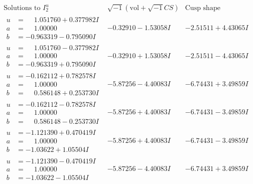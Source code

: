 \documentclass[1p]{elsarticle_modified}
\theoremstyle{definition}
\newcommand{\I}{\sqrt{-1}}
\begin{document}
$$\begin{array}{c|c|c}  
\text{Solutions to }I^u_{2}& \I (\text{vol} + \sqrt{-1}CS) & \text{Cusp shape}\\
 \hline 
\begin{aligned}
u &= \phantom{-}1.051760 + 0.377982 I \\
a &= \phantom{-}1.00000\phantom{ +0.000000I} \\
b &= -0.963319 - 0.795090 I\end{aligned}
 & -0.32910 - 1.53058 I & -2.51511 + 4.43065 I \\ \hline\begin{aligned}
u &= \phantom{-}1.051760 - 0.377982 I \\
a &= \phantom{-}1.00000\phantom{ +0.000000I} \\
b &= -0.963319 + 0.795090 I\end{aligned}
 & -0.32910 + 1.53058 I & -2.51511 - 4.43065 I \\ \hline\begin{aligned}
u &= -0.162112 + 0.782578 I \\
a &= \phantom{-}1.00000\phantom{ +0.000000I} \\
b &= \phantom{-}0.586148 + 0.253730 I\end{aligned}
 & -5.87256 - 4.40083 I & -6.74431 + 3.49859 I \\ \hline\begin{aligned}
u &= -0.162112 - 0.782578 I \\
a &= \phantom{-}1.00000\phantom{ +0.000000I} \\
b &= \phantom{-}0.586148 - 0.253730 I\end{aligned}
 & -5.87256 + 4.40083 I & -6.74431 - 3.49859 I \\ \hline\begin{aligned}
u &= -1.121390 + 0.470419 I \\
a &= \phantom{-}1.00000\phantom{ +0.000000I} \\
b &= -1.03622 + 1.05504 I\end{aligned}
 & -5.87256 + 4.40083 I & -6.74431 - 3.49859 I \\ \hline\begin{aligned}
u &= -1.121390 - 0.470419 I \\
a &= \phantom{-}1.00000\phantom{ +0.000000I} \\
b &= -1.03622 - 1.05504 I\end{aligned}
 & -5.87256 - 4.40083 I & -6.74431 + 3.49859 I \\ \hline\begin{aligned}

\end{aligned}
\end{array}$$
\end{document}
